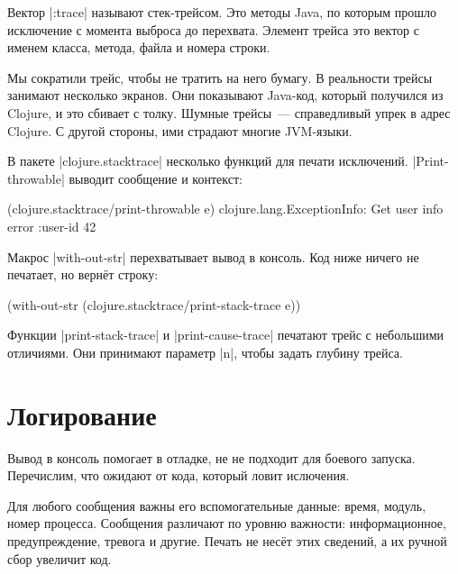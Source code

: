 
Вектор \spverb|:trace| называют стек-трейсом. Это методы Java, по которым прошло
исключение с момента выброса до перехвата. Элемент трейса это вектор с именем
класса, метода, файла и номера строки.

Мы сократили трейс, чтобы не тратить на него бумагу. В реальности трейсы
занимают несколько экранов. Они показывают Java-код, который получился из
Clojure, и это сбивает с толку. Шумные трейсы~--- справедливый упрек в адрес
Clojure. С другой стороны, ими страдают многие JVM-языки.


В пакете \spverb|clojure.stacktrace| несколько функций для печати
исключений. \spverb|Print-throwable| выводит сообщение и контекст:

\begin{english}
  \begin{clojure}
(clojure.stacktrace/print-throwable e)
clojure.lang.ExceptionInfo: Get user info error
{:user-id 42}
  \end{clojure}
\end{english}

Макрос \spverb|with-out-str| перехватывает вывод в консоль. Код ниже ничего не
печатает, но верн\"{е}т строку:

\begin{english}
  \begin{clojure}
(with-out-str
  (clojure.stacktrace/print-stack-trace e))
  \end{clojure}
\end{english}

Функции \spverb|print-stack-trace| и \spverb|print-cause-trace| печатают трейс с
небольшими отличиями. Они принимают параметр \spverb|n|, чтобы задать глубину
трейса.

\section{Логирование}


Вывод в консоль помогает в отладке, не не подходит для боевого
запуска. Перечислим, что ожидают от кода, который ловит ислючения.

Для любого сообщения важны его вспомогательные данные: время, модуль, номер
процесса. Сообщения различают по уровню важности: информационное,
предупреждение, тревога и другие. Печать не нес\"{е}т этих сведений, а их ручной
сбор увеличит код.

